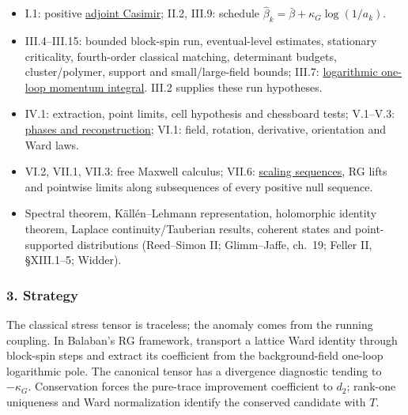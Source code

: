 \documentclass[
  letterpaper,
  11pt]{article}
\providecommand{\tightlist}{%
  \setlength{\itemsep}{0pt}\setlength{\parskip}{0pt}}
\begin{document}
\begin{itemize}
\tightlist
\item
  I.1: positive
  \href{https://github.com/yang-mills-group/OpenAI-YM-20261028/blob/3456e5e75cf8d4cd558955a5c7638fba2d68f464/YM/Gauge/Colors.lean\#L184}{adjoint
  Casimir}; II.2, III.9: schedule
  \(\hat\beta_k=\bar\beta+\kappa_G\log(1/a_k)\).
\item
  III.4--III.15: bounded block-spin run, eventual-level estimates,
  stationary criticality, fourth-order classical matching, determinant
  budgets, cluster/polymer, support and small/large-field bounds; III.7:
  \href{https://github.com/yang-mills-group/OpenAI-YM-20261028/blob/3456e5e75cf8d4cd558955a5c7638fba2d68f464/YM/Next/STATIONARY/OneLoop/MomentumIntegral.lean\#L346-L408}{logarithmic
  one-loop momentum integral}. III.2 supplies these run hypotheses.
\item
  IV.1: extraction, point limits, cell hypothesis and chessboard tests;
  V.1--V.3:
  \href{https://github.com/yang-mills-group/OpenAI-YM-20261028/blob/3456e5e75cf8d4cd558955a5c7638fba2d68f464/YM/Spec/Closed.lean\#L64-L73}{phases
  and reconstruction}; VI.1: field, rotation, derivative, orientation
  and Ward laws.
\item
  VI.2, VII.1, VII.3: free Maxwell calculus; VII.6:
  \href{https://github.com/yang-mills-group/OpenAI-YM-20261028/blob/3456e5e75cf8d4cd558955a5c7638fba2d68f464/YM/TraceExtension/Prom/Zoom/Running.lean\#L25-L31}{scaling
  sequences}, RG lifts and pointwise limits along subsequences of every
  positive null sequence.
\item
  Spectral theorem, Källén--Lehmann representation, holomorphic identity
  theorem, Laplace continuity/Tauberian results, coherent states and
  point-supported distributions (Reed--Simon II; Glimm--Jaffe, ch.~19;
  Feller II, §XIII.1--5; Widder).
\end{itemize}

\subsubsection{3. Strategy}\label{strategy-26}

The classical stress tensor is traceless; the anomaly comes from the
running coupling. In Balaban's RG framework, transport a lattice Ward
identity through block-spin steps and extract its coefficient from the
background-field one-loop logarithmic pole. The canonical tensor has a
divergence diagnostic tending to \(-\kappa_G\). Conservation forces the
pure-trace improvement coefficient to \(d_2\); rank-one uniqueness and
Ward normalization identify the conserved candidate with \(T\).
\end{document}

